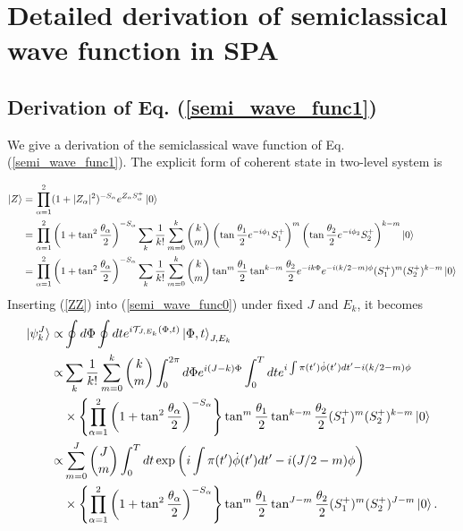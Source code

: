 \documentclass[11pt]{book} %
\begin{document}
\clearpage{\pagestyle{empty}\cleardoublepage}
\chapter{Detailed derivation of semiclassical wave function in SPA}
\section{Derivation of Eq. (\ref{semi_wave_func1})}
\label{wave_func1}

We give a derivation of the semiclassical wave function
of Eq. (\ref{semi_wave_func1}).
The explicit form of coherent state in two-level system is

\begin{align}
  \ket{Z} &= \prod_{\alpha=1}^2(1+|Z_{\alpha}|^2)^{-S_{\alpha}}e^{Z_{\alpha}S_{\alpha}^{+}}\ket{0} \nonumber \\
  &= \prod_{\alpha=1}^2\left(1+\tan^2{\frac{\theta_{\alpha}}{2}}\right)^{-S_{\alpha}} \sum_k \frac{1}{k!} \sum_{m=0}^k
  \binom{k}{m} \left(
  \tan{\frac{\theta_1}{2}}e^{-i\phi_1}S_1^{+} \right)^m \left(
  \tan{\frac{\theta_2}{2}}e^{-i\phi_2}S_2^{+} \right)^{k-m} \ket{0} \nonumber \\
  &= \prod_{\alpha=1}^2\left(1+\tan^2{\frac{\theta_{\alpha}}{2}}\right)^{-S_{\alpha}} \sum_k \frac{1}{k!} \sum_{m=0}^k
  \binom{k}{m} \tan^m{\frac{\theta_1}{2}}\tan^{k-m}{\frac{\theta_2}{2}}e^{-ik\Phi}e^{-i(k/2-m)\phi}
  (S_1^{+})^m(S_2^{+})^{k-m} \ket{0}
  \label{ZZ}
\end{align}
Inserting (\ref{ZZ}) into (\ref{semi_wave_func0}) under fixed $J$ and $E_k$,
it becomes
\begin{align}
	\ket{\psi_k^J} \propto& \oint d\Phi \oint dt
	e^{i\mathcal{T}_{J,E_k}(\Phi, t)}
	\ket{\Phi,t}_{J,E_k} \nonumber \\
  \propto& \sum_k \frac{1}{k!} \sum_{m=0}^k \binom{k}{m} \int_0^{2\pi} d\Phi e^{i(J-k)\Phi} 
  \int_0^T dt e^{i\int \pi(t') \dot{\phi}(t') dt'-i(k/2-m)\phi} \nonumber \\
  &\times \left\{ \prod_{\alpha=1}^2\left(1+\tan^2{\frac{\theta_{\alpha}}{2}}\right)^{-S_{\alpha}} \right\}
\tan^m{\frac{\theta_1}{2}}\tan^{k-m}\frac{\theta_2}{2}(S_1^{+})^m(S_2^{+})^{k-m} \ket{0} \nonumber \\
  \propto& \sum_{m=0}^{J} \binom{J}{m} \int_0^T dt \exp{\left( i\int \pi(t') \dot{\phi}(t') dt'-i(J/2-m)\phi \right)} \nonumber \\
  &\times \left\{ \prod_{\alpha=1}^2\left(1+\tan^2{\frac{\theta_{\alpha}}{2}}\right)^{-S_{\alpha}} \right\} 
\tan^m{\frac{\theta_1}{2}}\tan^{J-m}\frac{\theta_2}{2} (S_1^{+})^m(S_2^{+})^{J-m} \ket{0} . \label{semi_wave_func_b}
\end{align}
\end{document}
